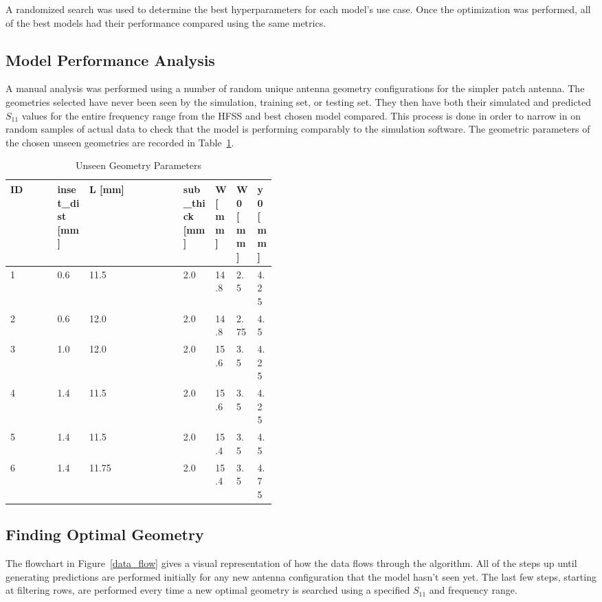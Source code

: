 \documentclass[conference]{IEEEtran}
\begin{document}
A randomized search was used to determine the best hyperparameters for each model's use case. Once the optimization was performed, all of the best models had their performance compared using the same metrics. 

\subsection{Model Performance Analysis}
A manual analysis was performed using a number of random unique antenna geometry configurations for the simpler patch antenna. The geometries selected have never been seen by the simulation, training set, or testing set. They then have both their simulated and predicted $S_{11}$ values for the entire frequency range from the HFSS and best chosen model compared. This process is done in order to narrow in on random samples of actual data to check that the model is performing comparably to the simulation software. The geometric parameters of the chosen unseen geometries are recorded in Table~\ref{unseen_geometries}.

\begin{table}[h]
\caption{Unseen Geometry Parameters}
\begin{center}
\begin{tabular}{ |l|p{0.12\linewidth}|l|p{0.12\linewidth}|p{0.07\linewidth}|p{0.07\linewidth}|p{0.07\linewidth}| }
    \hline
    ID & inset\_dist [mm] & L [mm] & sub\_thick [mm] & W [mm] & W0 [mm] & y0 [mm] \\ 
    \hline
    1 & 0.6 & 11.5 & 2.0 & 14.8 & 2.5 & 4.25 \\
    \hline
    2 & 0.6 & 12.0 & 2.0 & 14.8 & 2.75 & 4.5 \\
    \hline
    3 & 1.0 & 12.0 & 2.0 & 15.6 & 3.5 & 4.25 \\
    \hline
    4 & 1.4 & 11.5 & 2.0 & 15.6 & 3.5 & 4.25 \\
    \hline
    5 & 1.4 & 11.5 & 2.0 & 15.4 & 3.5 & 4.5 \\
    \hline
    6 & 1.4 & 11.75 & 2.0 & 15.4 & 3.5 & 4.75 \\
    \hline
\end{tabular}
\end{center}
\label{unseen_geometries}
\end{table}    

\subsection{Finding Optimal Geometry}
The flowchart in Figure~\ref{data_flow} gives a visual representation of how the data flows through the algorithm. All of the steps up until generating predictions are performed initially for any new antenna configuration that the model hasn't seen yet. The last few steps, starting at filtering rows, are performed every time a new optimal geometry is searched using a specified $S_{11}$ and frequency range. 
\end{document}
